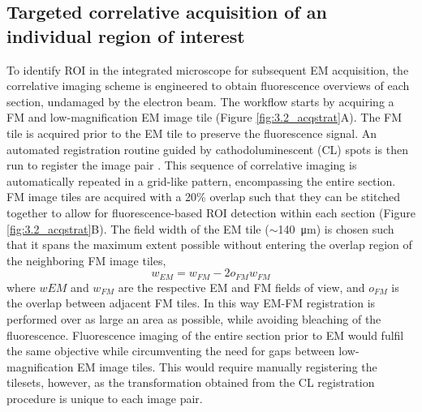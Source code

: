 \subsection{Targeted correlative acquisition of an individual region of interest}
\label{sec:3R_acqstrat}
To identify ROI in the integrated microscope for subsequent EM acquisition, the correlative imaging scheme is engineered to obtain fluorescence overviews of each section, undamaged by the electron beam. The workflow starts by acquiring a FM and low-magnification EM image tile (Figure \ref{fig:3.2_acqstrat}A). The FM tile is acquired prior to the EM tile to preserve the fluorescence signal. An automated registration routine guided by cathodoluminescent (CL) spots is then run to register the image pair \cite{haring2017automated}. This sequence of correlative imaging is automatically repeated in a grid-like pattern, encompassing the entire section. FM image tiles are acquired with a 20\% overlap such that they can be stitched together to allow for fluorescence-based ROI detection within each section (Figure \ref{fig:3.2_acqstrat}B). The field width of the EM tile (${\sim}$\SI{140}{\micro\meter}) is chosen such that it spans the maximum extent possible without entering the overlap region of the neighboring FM image tiles,
%
\begin{equation}
    w_{EM} = w_{FM} - 2 o_{FM} w_{FM}
\end{equation}
%
where $w{EM}$ and $w_{FM}$ are the respective EM and FM fields of view, and $o_{FM}$ is the overlap between adjacent FM tiles. In this way EM-FM registration is performed over as large an area as possible, while avoiding bleaching of the fluorescence. Fluorescence imaging of the entire section prior to EM would fulfil the same objective while circumventing the need for gaps between low-magnification EM image tiles. This would require manually registering the tilesets, however, as the transformation obtained from the CL registration procedure is unique to each image pair.

